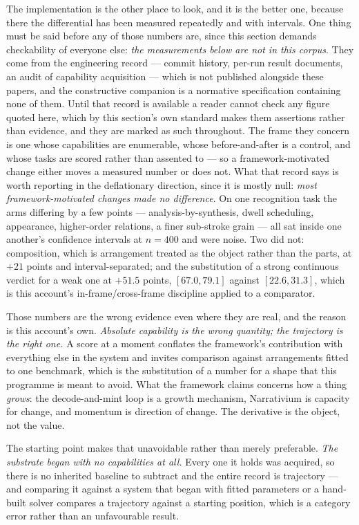 \documentclass[11pt,a4paper]{article}
\theoremstyle{remark}\newtheorem{remark}[definition]{Remark}
\begin{document}
The implementation is the other place to look, and it is the better one, because there the differential
has been measured repeatedly and with intervals. One thing must be said before any of those numbers
are, since this section demands checkability of everyone else: \emph{the measurements below are not in
this corpus}. They come from the engineering record --- commit history, per-run result documents, an
audit of capability acquisition --- which is not published alongside these papers, and the constructive
companion is a normative specification containing none of them. Until that record is available a reader
cannot check any figure quoted here, which by this section's own standard makes them assertions rather
than evidence, and they are marked as such throughout. The frame they concern is one whose capabilities
are enumerable, whose before-and-after is a control, and whose tasks are scored rather than assented
to --- so a framework-motivated change either moves a measured number or does not. What that
record says is worth reporting in the deflationary direction, since it is mostly null:
\emph{most framework-motivated changes made no difference}. On one recognition task the arms differing
by a few points --- analysis-by-synthesis, dwell scheduling, appearance, higher-order relations, a finer
sub-stroke grain --- all sat inside one another's confidence intervals at $n=400$ and were noise. Two
did not: composition, which is arrangement treated as the object rather than the parts, at $+21$
points and interval-separated; and the substitution of a strong continuous verdict for a weak one at
$+51.5$ points, $[67.0, 79.1]$ against $[22.6, 31.3]$, which is this account's in-frame/cross-frame
discipline applied to a comparator.

Those numbers are the wrong evidence even where they are real, and the reason is this account's own.
\emph{Absolute capability is the wrong quantity; the trajectory is the right one.} A score at a moment
conflates the framework's contribution with everything else in the system and invites comparison
against arrangements fitted to one benchmark, which is the substitution of a number for a shape that
this programme is meant to avoid. What the framework claims concerns how a thing \emph{grows}: the
decode-and-mint loop is a growth mechanism, Narrativium is capacity for change, and momentum is
direction of change. The derivative is the object, not the value.

The starting point makes that unavoidable rather than merely preferable. \emph{The substrate began with
no capabilities at all.} Every one it holds was acquired, so there is no inherited baseline to subtract
and the entire record is trajectory --- and comparing it against a system that began with fitted
parameters or a hand-built solver compares a trajectory against a starting position, which is a
category error rather than an unfavourable result.
\end{document}
